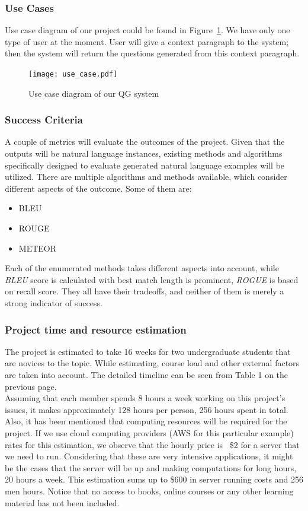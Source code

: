 \documentclass{mefsdp}
\begin{document}
	\pagebreak
	\subsubsection{Use Cases}
	Use case diagram of our project could be found in Figure \ref{usecases}. We have only one type of user at the moment. User will give a context paragraph to the system; then the system will return the questions generated from this context paragraph.
	\begin{figure}[ht!]
		\centering
		\texttt{[image: use\_case.pdf]}
		\caption{Use case diagram of our QG system\label{usecases}}
	\end{figure}
	
	\subsubsection{Success Criteria}\label{sc}
	A couple of metrics will evaluate the outcomes of the project. Given that the outputs will be natural language instances, existing methods and algorithms specifically designed to evaluate generated natural language examples will be utilized. There are multiple algorithms and methods available, which consider different aspects of the outcome. Some of them are:
	\begin{itemize}
		\item BLEU
		\item ROUGE
		\item METEOR\\
	\end{itemize}
	
	Each of the enumerated methods takes different aspects into account, while \textit{BLEU} score is calculated with best match length is prominent, \textit{ROGUE} is based on recall score. They all have their tradeoffs, and neither of them is merely a strong indicator of success.
	
	\subsubsection{Project time and resource estimation}
	The project is estimated to take 16 weeks for two undergraduate students that are novices to the topic. While estimating, course load and other external factors are taken into account. The detailed timeline can be seen from Table 1 on the previous page. \\
	
	Assuming that each member spends 8 hours a week working on this project's issues, it makes approximately 128 hours per person, 256 hours spent in total. Also, it has been mentioned that computing resources will be required for the project. If we use cloud computing providers (AWS for this particular example) rates for this estimation, we observe that the hourly price is ~\$2 for a server that we need to run. Considering that these are very intensive applications, it might be the cases that the server will be up and making computations for long hours, 20 hours a week. This estimation sums up to \$600 in server running costs and 256 men hours. Notice that no access to books, online courses or any other learning material has not been included.
	
\end{document}
